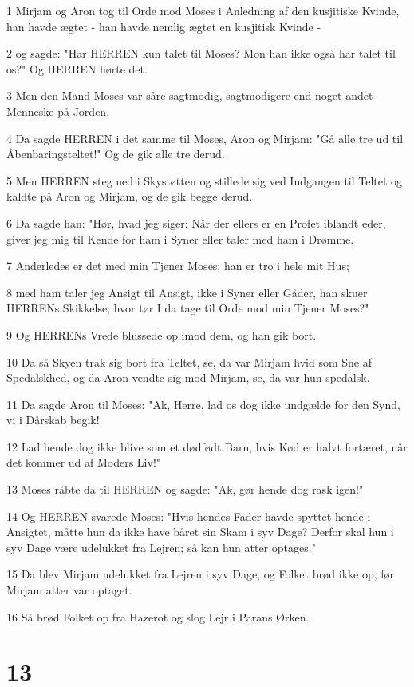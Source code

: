 \par 1 Mirjam og Aron tog til Orde mod Moses i Anledning af den kusjitiske Kvinde, han havde ægtet - han havde nemlig ægtet en kusjitisk Kvinde -
\par 2 og sagde: "Har HERREN kun talet til Moses? Mon han ikke også har talet til os?" Og HERREN hørte det.
\par 3 Men den Mand Moses var såre sagtmodig, sagtmodigere end noget andet Menneske på Jorden.
\par 4 Da sagde HERREN i det samme til Moses, Aron og Mirjam: "Gå alle tre ud til Åbenbaringsteltet!" Og de gik alle tre derud.
\par 5 Men HERREN steg ned i Skystøtten og stillede sig ved Indgangen til Teltet og kaldte på Aron og Mirjam, og de gik begge derud.
\par 6 Da sagde han: "Hør, hvad jeg siger: Når der ellers er en Profet iblandt eder, giver jeg mig til Kende for ham i Syner eller taler med ham i Drømme.
\par 7 Anderledes er det med min Tjener Moses: han er tro i hele mit Hus;
\par 8 med ham taler jeg Ansigt til Ansigt, ikke i Syner eller Gåder, han skuer HERRENs Skikkelse; hvor tør I da tage til Orde mod min Tjener Moses?"
\par 9 Og HERRENs Vrede blussede op imod dem, og han gik bort.
\par 10 Da så Skyen trak sig bort fra Teltet, se, da var Mirjam hvid som Sne af Spedalskhed, og da Aron vendte sig mod Mirjam, se, da var hun spedalsk.
\par 11 Da sagde Aron til Moses: "Ak, Herre, lad os dog ikke undgælde for den Synd, vi i Dårskab begik!
\par 12 Lad hende dog ikke blive som et dødfødt Barn, hvis Kød er halvt fortæret, når det kommer ud af Moders Liv!"
\par 13 Moses råbte da til HERREN og sagde: "Ak, gør hende dog rask igen!"
\par 14 Og HERREN svarede Moses: "Hvis hendes Fader havde spyttet hende i Ansigtet, måtte hun da ikke have båret sin Skam i syv Dage? Derfor skal hun i syv Dage være udelukket fra Lejren; så kan hun atter optages."
\par 15 Da blev Mirjam udelukket fra Lejren i syv Dage, og Folket brød ikke op, før Mirjam atter var optaget.
\par 16 Så brød Folket op fra Hazerot og slog Lejr i Parans Ørken.

\chapter{13}


